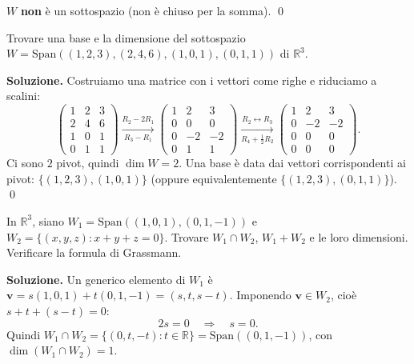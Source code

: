 $W$ \textbf{non} è un sottospazio (non è chiuso per la somma). \qed

\medskip

\begin{examplebox}
Trovare una base e la dimensione del sottospazio $W = \text{Span}((1, 2, 3), (2, 4, 6), (1, 0, 1), (0, 1, 1))$ di $\mathbb{R}^3$.
\end{examplebox}

\textbf{Soluzione.} Costruiamo una matrice con i vettori come righe e riduciamo a scalini:
\[ \begin{pmatrix} 1 & 2 & 3 \\ 2 & 4 & 6 \\ 1 & 0 & 1 \\ 0 & 1 & 1 \end{pmatrix} \xrightarrow[\scriptscriptstyle R_3 - R_1]{\scriptscriptstyle R_2 - 2R_1} \begin{pmatrix} 1 & 2 & 3 \\ 0 & 0 & 0 \\ 0 & -2 & -2 \\ 0 & 1 & 1 \end{pmatrix} \xrightarrow[\scriptscriptstyle R_4 + \frac{1}{2}R_2]{\scriptscriptstyle R_2 \leftrightarrow R_3} \begin{pmatrix} 1 & 2 & 3 \\ 0 & -2 & -2 \\ 0 & 0 & 0 \\ 0 & 0 & 0 \end{pmatrix}. \]
Ci sono $2$ pivot, quindi $\dim W = 2$. Una base è data dai vettori corrispondenti ai pivot: $\{(1, 2, 3), (1, 0, 1)\}$ (oppure equivalentemente $\{(1, 2, 3), (0, 1, 1)\}$). \qed

\medskip

\begin{examplebox}
In $\mathbb{R}^3$, siano $W_1 = \text{Span}((1, 0, 1), (0, 1, -1))$ e $W_2 = \{(x,y,z) : x + y + z = 0\}$. Trovare $W_1 \cap W_2$, $W_1 + W_2$ e le loro dimensioni. Verificare la formula di Grassmann.
\end{examplebox}

\textbf{Soluzione.} Un generico elemento di $W_1$ è $\mathbf{v} = s(1,0,1) + t(0,1,-1) = (s, t, s-t)$. Imponendo $\mathbf{v} \in W_2$, cioè $s + t + (s - t) = 0$:
\[ 2s = 0 \quad \Longrightarrow \quad s = 0. \]
Quindi $W_1 \cap W_2 = \{(0, t, -t) : t \in \mathbb{R}\} = \text{Span}((0, 1, -1))$, con $\dim(W_1 \cap W_2) = 1$.

